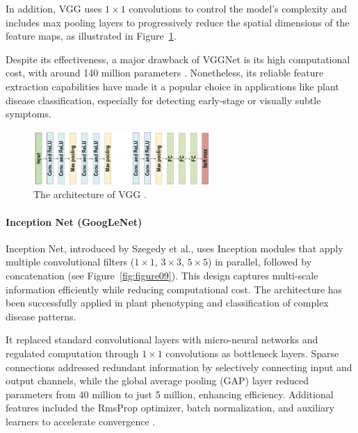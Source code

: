 In addition, VGG uses $1 \times 1$ convolutions to control the model’s complexity and includes max pooling layers to progressively reduce the spatial dimensions of the feature maps, as illustrated in Figure~\ref{fig:figure08}.

Despite its effectiveness, a major drawback of VGGNet is its high computational cost, with around 140 million parameters \parencite{alzubaidi2021review}. Nonetheless, its reliable feature extraction capabilities have made it a popular choice in applications like plant disease classification, especially for detecting early-stage or visually subtle symptoms.


\begin{figure}[H] %
    \centering
    \includegraphics[width=0.6\textwidth]{chapters/chapter1/images/Figure08.png}
    \caption{The architecture of VGG \parencite{alzubaidi2021review}.}
    \label{fig:figure08}
\end{figure}

\paragraph{Inception Net (GoogLeNet)}
Inception Net, introduced by Szegedy et al., uses Inception modules that apply multiple convolutional filters ($1 \times 1$, $3 \times 3$, $5 \times 5$) in parallel, followed by concatenation (see Figure~\ref{fig:figure09}). This design captures multi-scale information efficiently while reducing computational cost. The architecture has been successfully applied in plant phenotyping and classification of complex disease patterns.

It replaced standard convolutional layers with micro-neural networks and regulated computation through $1 \times 1$ convolutions as bottleneck layers. Sparse connections addressed redundant information by selectively connecting input and output channels, while the global average pooling (GAP) layer reduced parameters from 40 million to just 5 million, enhancing efficiency. Additional features included the RmsProp optimizer, batch normalization, and auxiliary learners to accelerate convergence \parencite{alzubaidi2021review}.



